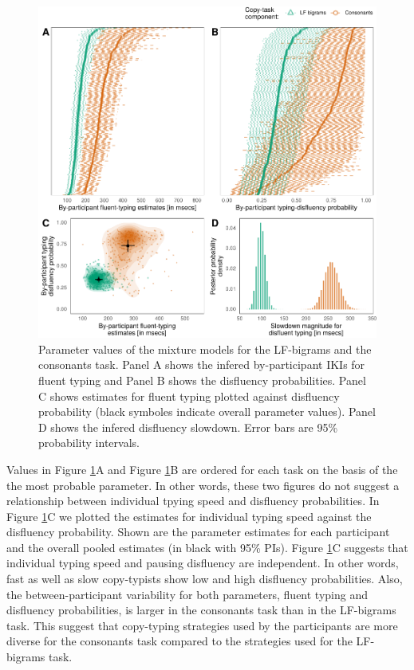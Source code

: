 \documentclass[
  english,
  man,mask,floatsintext]{apa7}
\begin{document}
\begin{figure}[!ht]

{\centering \includegraphics{report_files/figure-latex/parameters-1} 

}

\caption{Parameter values of the mixture models for the LF-bigrams and the consonants task. Panel A shows the infered by-participant IKIs for fluent typing and Panel B shows the disfluency probabilities. Panel C shows estimates for fluent typing plotted against disfluency probability (black symboles indicate overall parameter values). Panel D shows the infered disfluency slowdown. Error bars are 95\% probability intervals.}\label{fig:parameters}
\end{figure}

Values in Figure \ref{fig:parameters}A and Figure \ref{fig:parameters}B are ordered for each task on the basis of the the most probable parameter. In other words, these two figures do not suggest a relationship between individual tpying speed and disfluency probabilities. In Figure \ref{fig:parameters}C we plotted the estimates for individual typing speed against the disfluency probability. Shown are the parameter estimates for each participant and the overall pooled estimates (in black with 95\% PIs). Figure \ref{fig:parameters}C suggests that individual typing speed and pausing disfluency are independent. In other words, fast as well as slow copy-typists show low and high disfluency probabilities. Also, the between-participant variability for both parameters, fluent typing and disfluency probabilities, is larger in the consonants task than in the LF-bigrams task. This suggest that copy-typing strategies used by the participants are more diverse for the consonants task compared to the strategies used for the LF-bigrams task.
\end{document}
